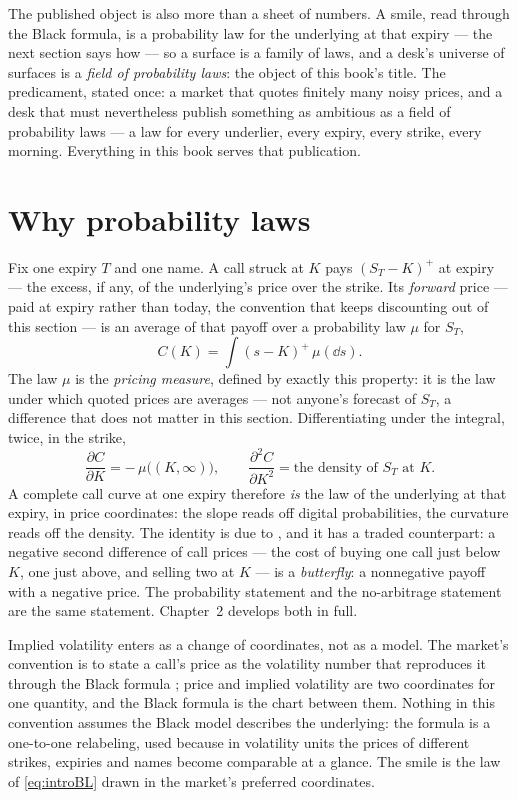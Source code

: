 The published object is also more than a sheet of numbers.  A smile,
read through the Black formula, is a probability law for the
underlying at that expiry --- the next section says how --- so a
surface is a family of laws, and a desk's universe of surfaces is a
\emph{field of probability laws}: the object of this book's title.
The predicament, stated once: a market that quotes finitely many
noisy prices, and a desk that must nevertheless publish something as
ambitious as a field of probability laws --- a law for every
underlier, every expiry, every strike, every morning.  Everything in
this book serves that publication.

\section{Why probability laws}
\label{sec:introlaw}

Fix one expiry $T$ and one name.  A call struck at $K$ pays
$(S_T-K)^{+}$ at expiry --- the excess, if any, of the underlying's
price over the strike.  Its \emph{forward} price --- paid at expiry
rather than today, the convention that keeps discounting out of this
section --- is an average of that payoff over a probability law
$\mu$ for $S_T$,
\[
C(K)=\int (s-K)^{+}\,\mu(\dd s).
\]
The law $\mu$ is the \emph{pricing measure}, defined by exactly this
property: it is the law under which quoted prices are averages ---
not anyone's forecast of $S_T$, a difference that does not matter in
this section.  Differentiating under the integral, twice, in the
strike,
\begin{equation}
\frac{\partial C}{\partial K}=-\,\mu\bigl((K,\infty)\bigr),
\qquad
\frac{\partial^{2} C}{\partial K^{2}}=\text{the density of } S_T
\text{ at } K.
\label{eq:introBL}
\end{equation}
A complete call curve at one expiry therefore \emph{is} the law of
the underlying at that expiry, in price coordinates: the slope reads
off digital probabilities, the curvature reads off the density.  The
identity is due to \citet{BreedenLitzenberger1978}, and it has a
traded counterpart: a negative second difference of call prices ---
the cost of buying one call just below $K$, one just above, and
selling two at $K$ --- is a \emph{butterfly}: a nonnegative payoff
with a negative price.  The
probability statement and the no-arbitrage statement are the same
statement.  Chapter~2 develops both in full.

Implied volatility enters as a change of coordinates, not as a model.
The market's convention is to state a call's price as the volatility
number that reproduces it through the Black formula
\citep{Black1976}; price and implied volatility are two coordinates
for one quantity, and the Black formula is the chart between them.
Nothing in this convention assumes the Black model describes the
underlying: the formula is a one-to-one relabeling, used because in
volatility units the prices of different strikes, expiries and names
become comparable at a glance.  The smile is the law of
\cref{eq:introBL} drawn in the market's preferred coordinates.

